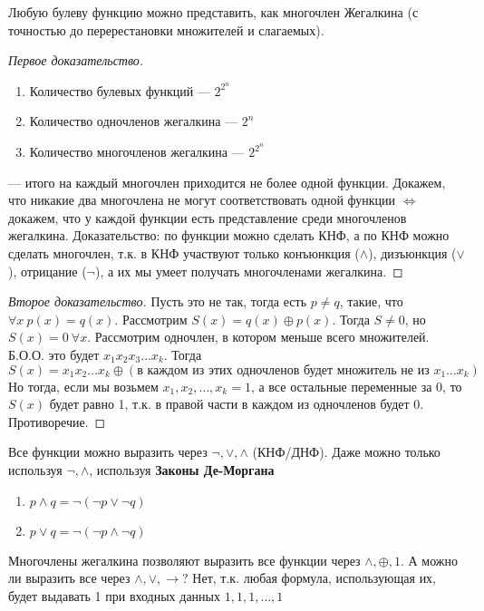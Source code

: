 \begin{theorem}
    Любую булеву функцию можно представить, как многочлен Жегалкина (с точностью до перерестановки множителей и слагаемых).
\end{theorem}
\begin{proof}[Первое доказательство]\indent
    \begin{enumerate}
        \item Количество булевых функций ---  $2^{2^n}$
        \item Количество одночленов жегалкина ---  $2^n$
        \item Количество многочленов жегалкина ---  $2^{2^n}$
    \end{enumerate}
    --- итого на каждый многочлен приходится не более одной функции. Докажем, что никакие два многочлена не могут соответствовать одной функции $\Leftrightarrow$ докажем, что у каждой функции есть представление среди многочленов жегалкина. Доказательство: по функции можно сделать КНФ, а по КНФ можно сделать многочлен, т.к. в КНФ участвуют только конъюнкция ($\wedge$), дизъюнкция ($\vee$), отрицание ($\neg$), а их мы умеет получать многочленами жегалкина.
\end{proof}
\begin{proof}[Второе доказательство]\indent
    Пусть это не так, тогда есть $p \ne q$, такие, что $\forall x\ p(x) = q(x)$. Рассмотрим $S(x) = q(x) \oplus p(x)$. Тогда $S \ne 0$, но $S(x) = 0\ \forall x$. Рассмотрим одночлен, в котором меньше всего множителей. Б.О.О. это будет $x_1x_2x_3\dots x_k$. Тогда 
    $$S(x) = x_1x_2\dots x_k \oplus (\text{в каждом из этих одночленов будет множитель не из }x_1\dots x_k)$$
    Но тогда, если мы возьмем $x_1, x_2, \dots, x_k = 1$, а все остальные переменные за 0, то $S(x)$ будет равно 1, т.к. в правой части в каждом из одночленов будет 0. Противоречие.
\end{proof}
Все функции можно выразить через $\neg, \vee, \wedge$ (КНФ/ДНФ). Даже можно только используя $\neg, \wedge$, используя \textbf{Законы Де-Моргана}
\begin{enumerate}
    \item $p\wedge q = \neg (\neg p \vee \neg q)$
    \item $p\vee q = \neg (\neg p \wedge \neg q)$
\end{enumerate}

Многочлены жегалкина позволяют выразить все функции через $\wedge, \oplus, 1$. А можно ли выразить все через $\wedge, \vee, \rightarrow$? Нет, т.к. любая формула, использующая их, будет выдавать 1 при входных данных $1, 1, 1, \dots, 1$

